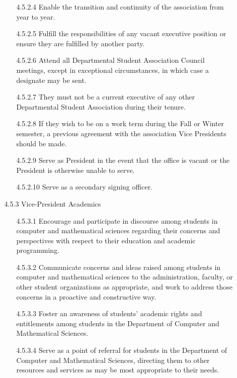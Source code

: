 \documentclass[12pt,a4paper]{article}
\begin{document}
\begin{enumerate}
\begin{enumerate}
\begin{enumerate}
\item[4.5.2.4] Enable the transition and continuity of the association from year to year.

\item[4.5.2.5] Fulfill the responsibilities of any vacant executive position or ensure they are fulfilled by another party.

\item[4.5.2.6] Attend all Departmental Student Association Council meetings, except in exceptional circumstances, in which case a designate may be sent.

\item[4.5.2.7] They must not be a current executive of any other Departmental Student Association during their tenure.

\item[4.5.2.8] If they wish to be on a work term during the Fall or Winter semester, a previous agreement with the association Vice Presidents should be made.

\item[4.5.2.9] Serve as President in the event that the office is vacant or the President is otherwise unable to serve.

\item[4.5.2.10] Serve as a secondary signing officer.
\end{enumerate}

\item[4.5.3] Vice-President Academics

\begin{enumerate}
\item[4.5.3.1] Encourage and participate in discourse among students in computer and mathematical sciences regarding their concerns and perspectives with respect to their education and academic programming.

\item[4.5.3.2] Communicate concerns and ideas raised among students in computer and mathematical sciences to the administration, faculty, or other student organizations as appropriate, and work to address those concerns in a proactive and constructive way.

\item[4.5.3.3] Foster an awareness of students' academic rights and entitlements among students in the Department of Computer and Mathematical Sciences.

\item[4.5.3.4] Serve as a point of referral for students in the Department of Computer and Mathematical Sciences, directing them to other resources and services as may be most appropriate to their needs.


\end{enumerate}
\end{enumerate}
\end{enumerate}
\end{document}
